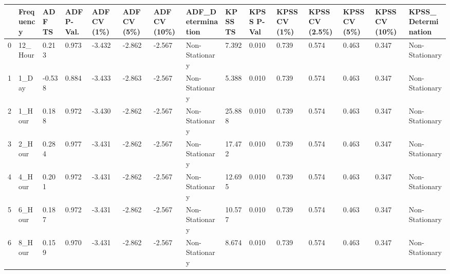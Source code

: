 \begin{tabular}{lllllllllllllll}
\toprule
 & Frequency & ADF TS & ADF P-Val. & ADF CV (1\%) & ADF CV (5\%) & ADF CV (10\%) & ADF_Determination & KPSS TS & KPSS P-Val & KPSS CV (1\%) & KPSS CV (2.5\%) & KPSS CV (5\%) & KPSS CV (10\%) & KPSS_Determination \\
\midrule
0 & 12_Hour & 0.213 & 0.973 & -3.432 & -2.862 & -2.567 & Non-Stationary & 7.392 & 0.010 & 0.739 & 0.574 & 0.463 & 0.347 & Non-Stationary \\
1 & 1_Day & -0.538 & 0.884 & -3.433 & -2.863 & -2.567 & Non-Stationary & 5.388 & 0.010 & 0.739 & 0.574 & 0.463 & 0.347 & Non-Stationary \\
2 & 1_Hour & 0.188 & 0.972 & -3.430 & -2.862 & -2.567 & Non-Stationary & 25.888 & 0.010 & 0.739 & 0.574 & 0.463 & 0.347 & Non-Stationary \\
3 & 2_Hour & 0.284 & 0.977 & -3.431 & -2.862 & -2.567 & Non-Stationary & 17.472 & 0.010 & 0.739 & 0.574 & 0.463 & 0.347 & Non-Stationary \\
4 & 4_Hour & 0.201 & 0.972 & -3.431 & -2.862 & -2.567 & Non-Stationary & 12.695 & 0.010 & 0.739 & 0.574 & 0.463 & 0.347 & Non-Stationary \\
5 & 6_Hour & 0.187 & 0.972 & -3.431 & -2.862 & -2.567 & Non-Stationary & 10.577 & 0.010 & 0.739 & 0.574 & 0.463 & 0.347 & Non-Stationary \\
6 & 8_Hour & 0.159 & 0.970 & -3.431 & -2.862 & -2.567 & Non-Stationary & 8.674 & 0.010 & 0.739 & 0.574 & 0.463 & 0.347 & Non-Stationary \\
\bottomrule
\end{tabular}
